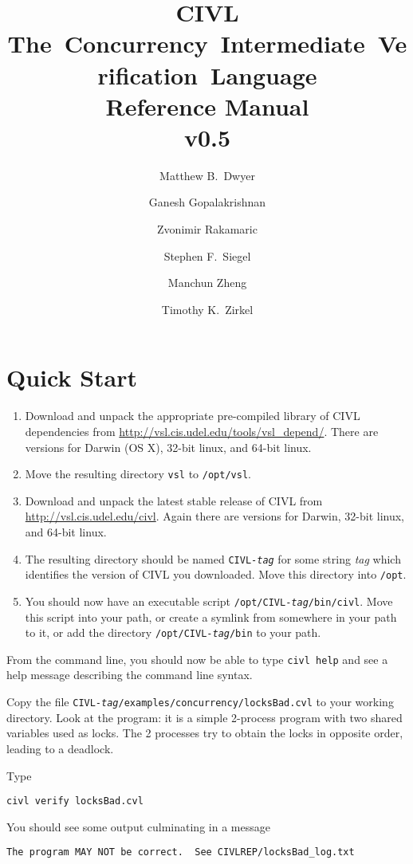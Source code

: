 \documentclass[11pt]{book}
\title{{\huge\bf CIVL}\\\mbox{The Concurrency Intermediate Verification
  Language}\\Reference Manual\\ v0.5}
\author{%
  Matthew B.\ Dwyer \and
  Ganesh Gopalakrishnan \and
  Zvonimir Rakamaric \and
  Stephen F.\ Siegel \and
  Manchun Zheng \and
  Timothy K.\ Zirkel
}
\begin{document}
\maketitle
\tableofcontents

\chapter{Quick Start}

\begin{enumerate}
\item Download and unpack the appropriate pre-compiled library of CIVL
  dependencies from \url{http://vsl.cis.udel.edu/tools/vsl_depend/}.
  There are versions for Darwin (OS X), 32-bit linux, and 64-bit
  linux.
\item Move the resulting directory \texttt{vsl} to \texttt{/opt/vsl}.
\item Download and unpack the latest stable release of CIVL from 
  \url{http://vsl.cis.udel.edu/civl}.  Again there are versions
  for Darwin, 32-bit linux, and 64-bit linux.
\item The resulting directory should be named
  \texttt{CIVL-\textit{tag}} for some string \textit{tag} which
  identifies the version of CIVL you downloaded.  Move this directory
  into \texttt{/opt}.
\item You should now have an executable script
  \texttt{/opt/CIVL-\textit{tag}/bin/civl}.  Move this script into
  your path, or create a symlink from somewhere in your path to it, or
  add the directory \texttt{/opt/CIVL-\textit{tag}/bin} to your path.
\end{enumerate}

From the command line, you should now be able to type \texttt{civl
  help} and see a help message describing the command line syntax.

Copy the file
\texttt{CIVL-\textit{tag}/examples/concurrency/locksBad.cvl} to your
working directory.  Look at the program: it is a simple 2-process
program with two shared variables used as locks.  The 2 processes try
to obtain the locks in opposite order, leading to a deadlock.

Type
\begin{verbatim}
civl verify locksBad.cvl
\end{verbatim}
You should see some output culminating in a message 
\begin{verbatim}
The program MAY NOT be correct.  See CIVLREP/locksBad_log.txt
\end{verbatim}
\end{document}
